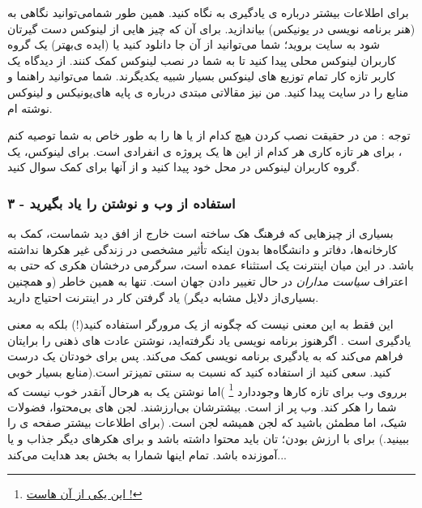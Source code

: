 برای اطلاعات بیشتر درباره ی یادگیری‌
 به
نگاه کنید. همین طور شمامی‌توانید نگاهی به
(هنر برنامه نویسی در یونیکس) بیاندازید.
برای آن که چیز هایی از لینوکس دست گیرتان شود به سایت
بروید؛ شما می‌توانید از آن جا دانلود کنید یا (ایده ی‌بهتر) یک گروه کاربران لینوکس محلی پیدا کنید تا به شما در نصب لینوکس کمک کنند. از دیدگاه یک کاربر تازه کار تمام توزیع های لینوکس بسیار شبیه یکدیگرند.
شما می‌توانید راهنما و منابع
 را در سایت
پیدا کنید.
من نیز مقالاتی مبتدی درباره ی پایه های‌یونیکس و لینوکس
نوشته ام.
\begin{mybox}
توجه : من در حقیقت نصب کردن هیچ کدام از 
 یا 
ها را به طور خاص به شما توصیه کنم ، برای هر تازه کاری هر کدام از این ها یک پروژه ی انفرادی است. برای لینوکس، یک گروه کاربران لینوکس در محل خود پیدا کنید و از آنها برای کمک سوال کنید.
\end{mybox}
\subsubsection*{۳ - استفاده از وب و نوشتن 
 را یاد بگیرید}
بسیاری از چیزهایی که فرهنگ هک ساخته است خارج از افق دید شماست، کمک به کارخانه‌ها، دفاتر و دانشگاه‌ها بدون اینکه تأثیر مشخصی در زندگی غیر هکرها نداشته باشد. در این میان اینترنت یک استثناء عمده است، سرگرمی درخشان هکری که حتی به اعتراف
\emph{سیاست مداران}
در حال تغییر دادن جهان است. تنها به همین خاطر (و همچنین بسیاری‌از دلایل مشابه دیگر) یاد گرفتن کار در اینترنت احتیاج دارید.

این فقط به این معنی نیست که چگونه از یک مرورگر استفاده کنید(!) بلکه به معنی یادگیری‌
 است . اگرهنوز برنامه نویسی یاد نگرفته‌اید، نوشتن 
 عادت های ذهنی‌ را برایتان فراهم می‌کند که به یادگیری برنامه نویسی کمک می‌کند. پس برای خودتان یک 
 درست کنید. سعی کنید از 
 استفاده کنید که نسبت به 
 سنتی تمیزتر است.(منابع بسیار خوبی برروی وب برای تازه کارها وجوددارد
\footnote{\href{http://www.make-a-web-site.com/}{این یکی از آن هاست !}}
)اما نوشتن یک 
 به هرحال آنقدر خوب نیست که شما را هکر کند. وب پر از 
 است. بیشترشان بی‌ارزشند. لجن های بی‌محتوا، فضولات شیک، اما مطمئن باشید که لجن همیشه لجن است. (برای اطلاعات بیشتر صفحه ی
را ببینید.)
برای با ارزش بودن؛ 
 تان باید محتوا داشته باشد و برای هکرهای دیگر جذاب و یا آموزنده باشد. تمام اینها شمارا به بخش بعد هدایت می‌کند...
